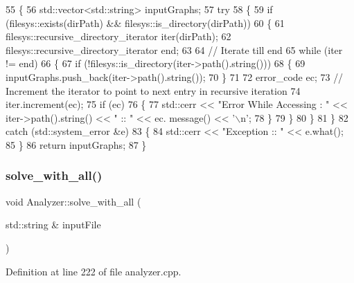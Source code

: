 \begin{DoxyCode}
55 \{
56     std::vector<std::string> inputGraphs;
57     \textcolor{keywordflow}{try}
58     \{
59         \textcolor{keywordflow}{if} (filesys::exists(dirPath) && filesys::is\_directory(dirPath))
60         \{
61             filesys::recursive\_directory\_iterator iter(dirPath);
62             filesys::recursive\_directory\_iterator end;
63 
64             \textcolor{comment}{// Iterate till end}
65             \textcolor{keywordflow}{while} (iter != end)
66             \{
67                 \textcolor{keywordflow}{if} (!filesys::is\_directory(iter->path().string()))
68                 \{
69                     inputGraphs.push\_back(iter->path().string());
70                 \}
71 
72                 error\_code ec;
73                 \textcolor{comment}{// Increment the iterator to point to next entry in recursive iteration}
74                 iter.increment(ec);
75                 \textcolor{keywordflow}{if} (ec)
76                 \{
77                     std::cerr << \textcolor{stringliteral}{"Error While Accessing : "} << iter->path().string() << \textcolor{stringliteral}{" :: "} << ec.
      message() << \textcolor{charliteral}{'\(\backslash\)n'};
78                 \}
79             \}
80         \}
81     \}
82     \textcolor{keywordflow}{catch} (std::system\_error &e)
83     \{
84         std::cerr << \textcolor{stringliteral}{"Exception :: "} << e.what();
85     \}
86     \textcolor{keywordflow}{return} inputGraphs;
87 \}
\end{DoxyCode}
\mbox{\label{class_analyzer_a471ed64111b58f49cfee911b5db93ada}} 
\subsubsection{\texorpdfstring{solve\+\_\+with\+\_\+all()}{solve\_with\_all()}}
{\footnotesize\ttfamily void Analyzer\+::solve\+\_\+with\+\_\+all (\begin{DoxyParamCaption}\item[{std\+::string \&}]{input\+File }\end{DoxyParamCaption})}



Definition at line 222 of file analyzer.\+cpp.


